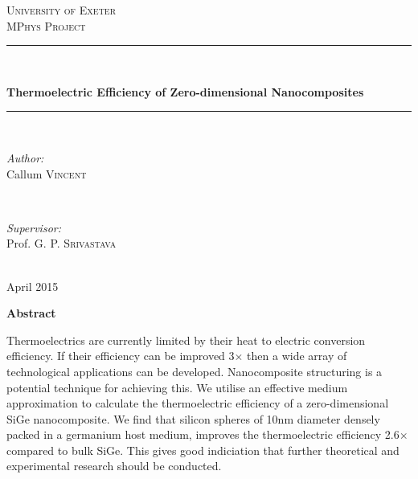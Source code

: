 \documentclass[12pt,draft]{article}
\begin{document}

\pagestyle{empty}

\begin{titlepage}
\center
\textsc{\huge University of Exeter}\\[1cm]
\textsc{\Large MPhys Project}\\[1.5cm]

\rule{\linewidth}{0.5mm}\\[0.4cm]
\begin{doublespace}
{\LARGE \textbf{Thermoelectric Efficiency of Zero-dimensional Nanocomposites}}\\[0cm]
\end{doublespace}
\rule{\linewidth}{0.5mm}\\[2.5cm]
 
\begin{minipage}{0.4\textwidth}
\begin{flushleft} \large
\emph{Author:}\\
Callum \textsc{Vincent}
\end{flushleft}
\end{minipage}
~
\begin{minipage}{0.4\textwidth}
\begin{flushright} \large
\emph{Supervisor:} \\
Prof. G. P. \textsc{Srivastava}
\end{flushright}
\end{minipage}\\[4cm]

{\large April 2015}

\pagedecorationleft
\pagedecorationright
\end{titlepage}

\begin{center}
{\Huge\textbf{Abstract}}\\[2cm]
\end{center}
\begin{justify}
Thermoelectrics are currently limited by their heat to electric conversion efficiency. If their efficiency can be improved 3$\times$ then a wide array of technological applications can be developed. Nanocomposite structuring is a potential technique for achieving this. We utilise an effective medium approximation to calculate the thermoelectric efficiency of a zero-dimensional SiGe nanocomposite. We find that silicon spheres of 10nm diameter densely packed in a germanium host medium, improves the thermoelectric efficiency 2.6$\times$ compared to bulk SiGe. This gives good indiciation that further theoretical and experimental research should be conducted.
\end{justify}
\end{document}
